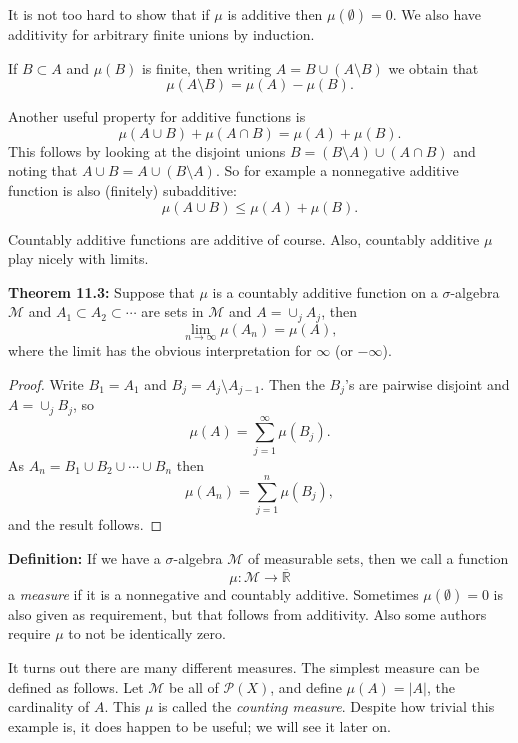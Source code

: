 \documentclass[12pt]{book}
\newcommand{\abs}[1]{\left\lvert {#1} \right\rvert}
\newcommand{\R}{{\mathbb{R}}}
\newcommand{\sM}{{\mathcal{M}}}
\newcommand{\sP}{{\mathcal{P}}}
\theoremstyle{plain}
\theoremstyle{remark}
\theoremstyle{definition}
\theoremstyle{exercise}
\theoremstyle{example}
\begin{document}
\medskip

It is not too hard to show that if $\mu$ is additive then $\mu(\emptyset) =
0$.  We also have additivity for arbitrary finite unions by induction.

If $B \subset A$ and $\mu(B)$ is finite, then
writing $A = B \cup (A\setminus B)$ we obtain that 
$$
\mu(A\setminus B) = \mu(A) - \mu(B) .
$$

Another useful property for additive functions is
$$
\mu(A \cup B) + \mu(A \cap B) = \mu(A) + \mu(B) .
$$
This follows by looking at the disjoint unions
$B = (B \setminus A) \cup (A \cap B)$ and noting that $A \cup B = A \cup (B
\setminus A)$.  So for example a nonnegative additive function is
also (finitely) subadditive:
$$
\mu(A \cup B) \leq \mu(A) + \mu(B) .
$$

Countably additive functions are additive of course.
Also, countably additive $\mu$ play nicely with limits.

\medskip

\textbf{Theorem 11.3:}
Suppose that $\mu$ is a countably additive function on a $\sigma$-algebra
$\sM$ and $A_1 \subset A_2 \subset \cdots$ are sets in $\sM$
and $A = \cup_j A_j$, then
$$
\lim_{n \to \infty} \mu(A_n) = \mu (A) ,
$$
where the limit has the obvious interpretation for $\infty$ (or $-\infty$).

\medskip

\begin{proof}
Write $B_1 = A_1$ and $B_j = A_j \setminus A_{j-1}$.
Then the $B_j$'s are pairwise disjoint and $A = \cup_j B_j$, so
$$
\mu(A) = \sum_{j=1}^\infty \mu(B_j) .
$$
As $A_n = B_1 \cup B_2 \cup \cdots \cup B_n$ then
$$
\mu(A_n) = \sum_{j=1}^n \mu(B_j) ,
$$
and the result follows.
\end{proof}

\medskip

\textbf{Definition:}
If we have a $\sigma$-algebra $\sM$ of measurable sets, then we call a
function
$$
\mu \colon \sM \to \overline{\R}
$$
a \emph{measure} if it is a nonnegative and countably additive.  Sometimes
$\mu(\emptyset) = 0$ is also given as requirement, but that follows from
additivity.  Also some authors require $\mu$ to not be identically zero.

\medskip

It turns out there are many different measures.  The simplest measure can be
defined as follows.  Let $\sM$ be all of $\sP(X)$, and define
$\mu(A) = \abs{A}$, the cardinality of $A$.  This $\mu$ is called the
\emph{counting measure}.  Despite how trivial this example
is, it does happen to be useful; we will see it later on.
\end{document}
